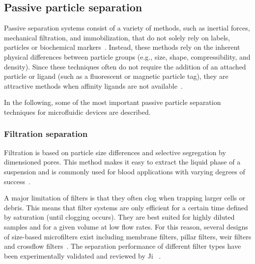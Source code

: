 \subsection{Passive particle separation}
Passive separation systems consist of a variety of methods, such as inertial forces, mechanical filtration, and immobilization, that do not solely rely on labels, particles or biochemical markers~\cite{Tsutsui2009}. Instead, these methods rely on the inherent physical differences between particle groups (e.g., size, shape, compressibility, and density). Since these techniques often do not require the addition of an attached particle or ligand (such as a fluorescent or magnetic particle tag), they are attractive methods when affinity ligands are not available~\cite{Sollier2009}. 


In the following, some of the most important passive particle separation techniques for microfluidic devices are described.

\subsubsection{Filtration separation}
Filtration is based on particle size differences and selective segregation by dimensioned pores. This method makes it easy to extract the liquid phase of a suspension and is commonly used for blood applications with varying degrees of success~\cite{Crowley2005,Ji2008,Chen2008}.

A major limitation of filters is that they often clog when trapping larger cells or debris. This means that filter systems are only efficient for a certain time defined by saturation (until clogging occurs). They are best suited for highly diluted samples and for a given volume at low flow rates. For this reason, several designs of size-based microfilters exist including membrane filters, pillar filters, weir filters and crossflow filters~\cite{Ji2008}. The separation performance of different filter types have been experimentally validated and reviewed by Ji \etal{}~\cite{Ji2008}.

